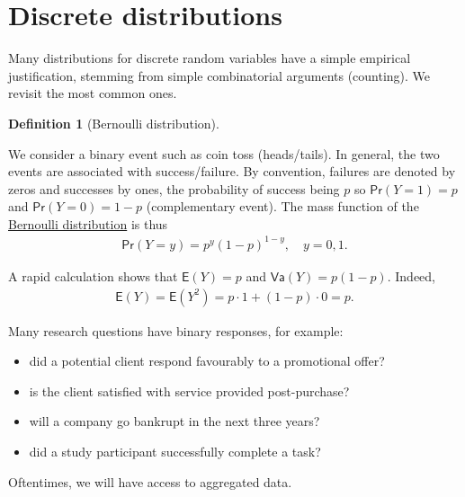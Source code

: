 \documentclass[
  11pt,
  letterpaper,
]{scrbook}
\providecommand{\tightlist}{%
  \setlength{\itemsep}{0pt}\setlength{\parskip}{0pt}}\usepackage{longtable,booktabs,array}
\theoremstyle{plain}
\theoremstyle{definition}
\theoremstyle{definition}
\newtheorem{definition}{Definition}[chapter]
\theoremstyle{remark}
\begin{document}
\section{Discrete distributions}\label{discrete-distributions}

Many distributions for discrete random variables have a simple empirical
justification, stemming from simple combinatorial arguments (counting).
We revisit the most common ones.

\begin{definition}[Bernoulli
distribution]\protect\hypertarget{def-bernoullidist}{}\label{def-bernoullidist}

We consider a binary event such as coin toss (heads/tails). In general,
the two events are associated with success/failure. By convention,
failures are denoted by zeros and successes by ones, the probability of
success being \(p\) so \(\mathsf{Pr}(Y=1)=p\) and
\(\mathsf{Pr}(Y=0)=1-p\) (complementary event). The mass function of the
\href{https://en.wikipedia.org/wiki/Bernoulli_distribution}{Bernoulli
distribution} is thus \begin{align*}
\mathsf{Pr}(Y=y) = p^y (1-p)^{1-y}, \quad y=0, 1.
\end{align*}

\end{definition}

A rapid calculation shows that \(\mathsf{E}(Y)=p\) and
\(\mathsf{Va}(Y)=p(1-p).\) Indeed, \begin{align*}
\mathsf{E}(Y) = \mathsf{E}(Y^2) = p \cdot 1 + (1-p) \cdot 0 = p.
\end{align*}

Many research questions have binary responses, for example:

\begin{itemize}
\tightlist
\item
  did a potential client respond favourably to a promotional offer?
\item
  is the client satisfied with service provided post-purchase?
\item
  will a company go bankrupt in the next three years?
\item
  did a study participant successfully complete a task?
\end{itemize}

Oftentimes, we will have access to aggregated data.
\end{document}
